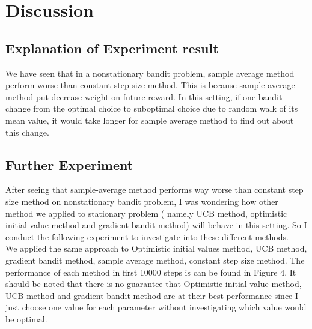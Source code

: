 \documentclass[12pt]{article}
\begin{document}
\pagebreak

\section{Discussion}
\subsection{Explanation of Experiment result}
We have seen that in a nonstationary bandit problem, sample average method perform worse than constant step size method. This is because sample average method put decrease weight on future reward. In this setting, if one bandit change from the optimal choice to suboptimal choice due to random walk of its mean value, it would take longer for sample average method to find out about this change. \\

\subsection{Further Experiment}
After seeing that sample-average method performs way worse than constant step size method on nonstationary bandit problem, I was wondering how other method we applied to stationary problem ( namely UCB method, optimistic initial value method and gradient bandit method) will behave in this setting. So I conduct the following experiment to investigate into these different methods.\\

We applied the same approach to Optimistic initial values method, UCB method, gradient bandit method, sample average method, constant step size method. The performance of each method in first 10000 steps is can be found in Figure 4. It should be noted that there is no guarantee that Optimistic initial value method, UCB method and gradient bandit method are at their best performance since I just choose one value for each parameter without investigating which value would be optimal.
\end{document}
